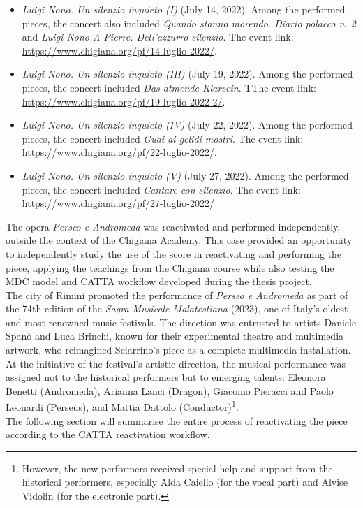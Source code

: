 \begin{itemize}
    \item \textit{Luigi Nono. Un silenzio inquieto (I)} (July 14, 2022). Among the performed pieces, the concert also included \textit{Quando stanno morendo. Diario polacco n. 2} and \textit{Luigi Nono A Pierre. Dell’azzurro silenzio}. The event link: \url{https://www.chigiana.org/pf/14-luglio-2022/}.
    \item \textit{Luigi Nono. Un silenzio inquieto (III)} (July 19, 2022). Among the performed pieces, the concert included \textit{Das atmende Klarsein}. TThe event link: \url{https://www.chigiana.org/pf/19-luglio-2022-2/}.
    \item \textit{Luigi Nono. Un silenzio inquieto (IV)} (July 22, 2022). Among the performed pieces, the concert included \textit{Guai ai gelidi mostri}. The event link: \url{https://www.chigiana.org/pf/22-luglio-2022/}.
    \item \textit{Luigi Nono. Un silenzio inquieto (V)} (July 27, 2022). Among the performed pieces, the concert included \textit{Cantare con silenzio}. The event link: \url{https://www.chigiana.org/pf/27-luglio-2022/}
\end{itemize}
The opera \textit{Perseo e Andromeda} was reactivated and performed independently, outside the context of the Chigiana Academy. This case provided an opportunity to independently study the use of the score in reactivating and performing the piece, applying the teachings from the Chigiana course while also testing the MDC model and CATTA workflow developed during the thesis project.\\
\newline
The city of Rimini promoted the performance of \textit{Perseo e Andromeda} as part of the 74th edition of the \textit{Sagra Musicale Malatestiana} (2023), one of Italy’s oldest and most renowned music festivals. The direction was entrusted to artists Daniele Spanò and Luca Brinchi, known for their experimental theatre and multimedia artwork, who reimagined Sciarrino’s piece as a complete multimedia installation. At the initiative of the festival’s artistic direction, the musical performance was assigned not to the historical performers but to emerging talents: Eleonora Benetti (Andromeda), Arianna Lanci (Dragon), Giacomo Pieracci and Paolo Leonardi (Perseus), and Mattia Dattolo (Conductor)\footnote{However, the new performers received special help and support from the historical performers, especially Alda Caiello (for the vocal part) and Alvise Vidolin (for the electronic part).}.\\
The following section will summarise the entire process of reactivating the piece according to the CATTA reactivation workflow.


